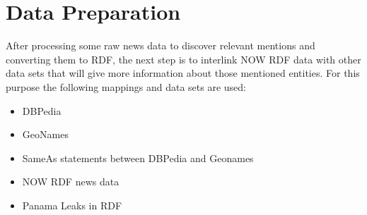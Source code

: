 \section{Data Preparation}
After processing some raw news data to discover relevant mentions and converting them to RDF, the next step is to interlink NOW RDF data with other data sets that will give more information about those mentioned entities. For this purpose the following mappings and data sets are used: 
\begin{itemize}
    \item DBPedia
    \item GeoNames
    \item SameAs statements between DBPedia and Geonames
    \item NOW RDF news data
    \item Panama Leaks in RDF
\end{itemize}

